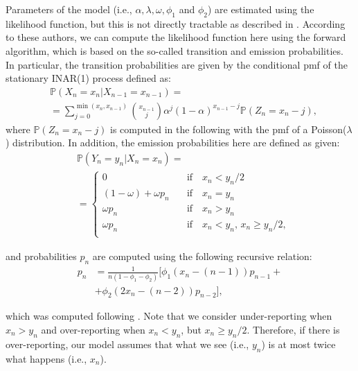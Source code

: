 \documentclass[Afour,sageh,times]{sagej}
\begin{document}
Parameters of the model (i.e., $\alpha, \lambda, \omega, \phi_1$ and $\phi_2$) are estimated using the likelihood function, but this is not directly tractable as described in \cite{fernandez-fontelo_a_cabana_a_puig_p_and_morina_d_under-reported_2016, fernandezfontelo_a_cabana_a_joe_h_puig_p_and_morina_d_untangling_2019}. According to these authors, we can compute the likelihood function here using the forward algorithm, which is based on the so-called transition and emission probabilities. In particular, the transition probabilities are given by the conditional pmf of the stationary INAR(1) process defined as: 
\begin{align}\label{transition}
&\mathbb{P}(X_n=x_n|X_{n-1}=x_{n-1}) = \nonumber \\ & =\sum_{j=0}^{\min(x_n,x_{n-1})} \binom{x_{n-1}}{j} \alpha^j (1-\alpha)^{x_{n-1}-j} \mathbb{P}(Z_n=x_n-j), 
\end{align}
where $\mathbb{P}(Z_n=x_n-j)$ is computed in the following with the pmf of a Poisson($\lambda$) distribution. In  addition, the emission probabilities here are defined as given:
\begin{align}\label{emission}
& \mathbb{P}(Y_n=y_n|X_n=x_n) \nonumber = \\ & = \begin{cases}
0 & \quad \textrm{if} \quad x_n < y_n/2\\
(1-\omega)+\omega p_n & \quad \textrm{if} \quad x_n=y_n \\
\omega p_n & \quad \textrm{if}  \quad x_n > y_n\\
 \omega p_n & \quad \textrm{if}  \quad x_n < y_n, \, x_n \geq y_n/2,\\	
\end{cases}
\end{align}

and probabilities $p_n$ are computed using the following recursive relation:
\begin{align}\label{recursion}
p_n&=\frac{1}{n(1-\phi_1-\phi_2)} \bigl[ \phi_1 (x_n-(n-1))p_{n-1}+ \nonumber \\ & +\phi_2(2x_n-(n-2))p_{n-2} \bigr],
\end{align}

which was computed following \cite{baena-mirabete_computing_2020}. Note that we consider under-reporting when $x_n>y_n$ and over-reporting when $x_n < y_n$, but $x_n \geq y_n/2$. Therefore, if there is over-reporting, our model assumes that what we see (i.e., $y_n$) is at most twice what happens (i.e., $x_n$).
\end{document}

